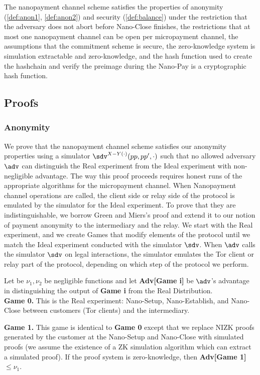 The nanopayment channel scheme satisfies the properties of anonymity (\ref{def:anon1}, \ref{def:anon2}) and security (\ref{def:balance}) under the restriction that the adversary does not abort before Nano-Close finishes, the restrictions that at most one nanopayment channel can be open per micropayment channel, the assumptions that the commitment scheme is secure, the zero-knowledge system is simulation extractable and zero-knowledge, and the hash function used to create the hashchain and verify the preimage during the Nano-Pay is a cryptographic hash function.

\subsection{Proofs}

\subsubsection{Anonymity}

\sloppy We prove that the nanopayment channel scheme satisfies our anonymity properties using a simulator $\sdv^{X-Y(\cdot)}(pp,pp',\cdot)$ such that no allowed adversary $\adv$ can distinguish the Real experiment from the Ideal experiment with non-negligible advantage.
The way this proof proceeds requires honest runs of the appropriate algorithms for the micropayment channel.
When Nanopayment channel operations are called, the client side or relay side of the protocol is emulated by the simulator for the Ideal experiment.
To prove that they are indistinguishable, we borrow Green and Miers's proof and extend it to our notion of payment anonymity to the intermediary and the relay.
We start with the Real experiment, and we create Games that modify elements of the protocol until we match the Ideal experiment conducted with the simulator $\sdv$.
When $\adv$ calls the simulator $\sdv$ on legal interactions, the simulator emulates the Tor client or relay part of the protocol, depending on which step of the protocol we perform.

Let be $\nu_1, \nu_2$ be negligible functions and let \textbf{Adv[Game i]} be $\adv$'s advantage in distinguishing the output of \textbf{Game i} from the Real Distribution.
\\

\textbf{Game 0.}
This is the Real experiment: Nano-Setup, Nano-Establish, and Nano-Close between customers (Tor clients) and the intermediary.

\textbf{Game 1.}
This game is identical to \textbf{Game 0} except that we replace NIZK proofs generated by the customer at the Nano-Setup and Nano-Close with simulated proofs (we assume the existence of a ZK simulation algorithm which can extract a simulated proof).
If the proof system is zero-knowledge, then \textbf{Adv[Game 1] $\leq \nu_1$}.

